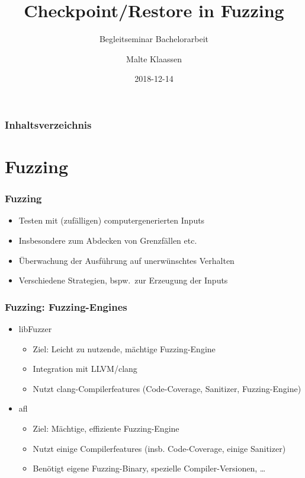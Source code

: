 \documentclass[handout]{beamer}
\title[Checkpoint/Restore in Fuzzing]{Checkpoint/Restore in Fuzzing}
\subtitle{Begleitseminar Bachelorarbeit}
\author[Klaassen]{Malte Klaassen}
\date{2018-12-14}
\begin{document}
\begin{frame}%
\titlepage
\end{frame}

\begin{frame}%
	\frametitle{Inhaltsverzeichnis}
	\tableofcontents%
\end{frame}

\section{Fuzzing}
\begin{frame}
    \frametitle{Fuzzing}
    \begin{itemize}
        \item Testen mit (zufälligen) computergenerierten Inputs
        \item Insbesondere zum Abdecken von Grenzfällen etc.
        \item Überwachung der Ausführung auf unerwünschtes Verhalten
        \item Verschiedene Strategien, bspw.\ zur Erzeugung der Inputs
    \end{itemize}
\end{frame}

\begin{frame}
    \frametitle{Fuzzing: Fuzzing-Engines}
    \begin{itemize}
        \item libFuzzer
            \begin{itemize}
                \item Ziel: Leicht zu nutzende, mächtige Fuzzing-Engine
                \item Integration mit LLVM/clang
                \item Nutzt clang-Compilerfeatures (Code-Coverage, Sanitizer, Fuzzing-Engine)
            \end{itemize}
        \item afl
            \begin{itemize}
                \item Ziel: Mächtige, effiziente Fuzzing-Engine
                \item Nutzt einige Compilerfeatures (insb. Code-Coverage, einige Sanitizer)
                \item Benötigt eigene Fuzzing-Binary, spezielle Compiler-Versionen, \dots
            \end{itemize}
    \end{itemize}
\end{frame}
\end{document}
